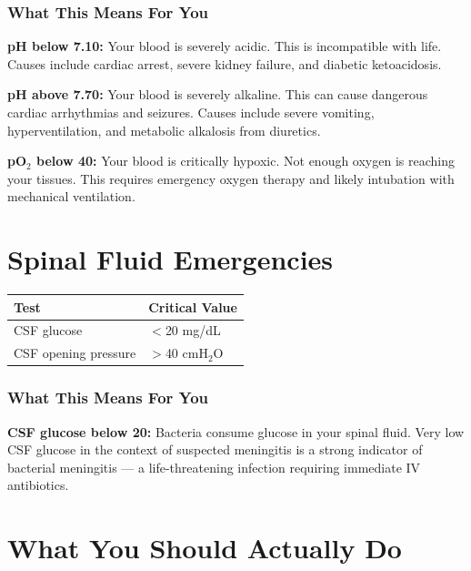 \subsubsection{What This Means For You}

\textbf{pH below 7.10:} Your blood is severely acidic. This is incompatible with life. Causes include cardiac arrest, severe kidney failure, and diabetic ketoacidosis.

\textbf{pH above 7.70:} Your blood is severely alkaline. This can cause dangerous cardiac arrhythmias and seizures. Causes include severe vomiting, hyperventilation, and metabolic alkalosis from diuretics.

\textbf{pO$_2$ below 40:} Your blood is critically hypoxic. Not enough oxygen is reaching your tissues. This requires emergency oxygen therapy and likely intubation with mechanical ventilation.

\clearpage
\section{Spinal Fluid Emergencies}

\begin{longtable}{@{}ll@{}}
\toprule
\textbf{Test} & \textbf{Critical Value} \\
\midrule
CSF glucose & $<$20 mg/dL \\
CSF opening pressure & $>$40 cmH$_2$O \\
\bottomrule
\end{longtable}

\subsubsection{What This Means For You}

\textbf{CSF glucose below 20:} Bacteria consume glucose in your spinal fluid. Very low CSF glucose in the context of suspected meningitis is a strong indicator of bacterial meningitis --- a life-threatening infection requiring immediate IV antibiotics.

\clearpage
\section{What You Should Actually Do}

